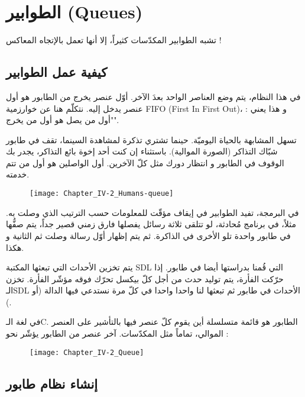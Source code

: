 \section{الطوابير (\textenglish{Queues})}

تشبه الطوابير المكدّسات كثيراً، إلا أنها تعمل بالإتجاه المعاكس !

\subsection{كيفية عمل الطوابير}

في هذا النظام، يتم وضع العناصر الواحد بعدَ الآخر. أوّل عنصر يخرج من الطابور هو أول عنصر يدخل إليه. نتكلّم هنا عن خوارزمية 
\textenglish{FIFO} (\textenglish{First In First Out})،
و هذا يعني : "أول من يصل هو أول من يخرج".

تسهل المشابهة بالحياة اليوميّة. حينما تشتري تذكرة لمشاهدة السينما، تقف في طابور شبّاك التذاكر (الصورة الموالية). باستثناء إن كنت أحد إخوة بائع التذاكر، يجدر بك الوقوف في الطابور و انتظار دورك مثل كلّ الآخرين. أول الواصلين هو أول من تتم خدمته.

\begin{figure}[H]
	\centering
	\texttt{[image: Chapter\_IV-2\_Humans-queue]}
\end{figure}

 في البرمجة، تفيد الطوابير في إيقاف مؤقّت للمعلومات حسب الترتيب الذي وصلت به. مثلاً، في برنامج مُحادثة، لو تتلقى ثلاثة رسائل يفصلها فارق زمني قصير جداً، يتم صفُّها في طابور واحدة تلو الأخرى في الذاكرة. ثم يتم إظهار أوّل رسالة وصلت ثم الثانية و هكذا.
 
يتم تخزين الأحداث التي تبعثها المكتبة
\textenglish{SDL}
التي قُمنا بدراستها أيضا في طابور. إذا حرّكت الفأرة، يتم توليد حدث من أجل كلّ بيكسل تحرّك فوقه مؤشّر الفأرة. تخزن الـ\textenglish{SDL}
الأحداث في طابور ثم تبعثها لنا واحدا واحدا في كلّ مرة نستدعي فيها الدالة
(أو
).

في لغة الـ\textenglish{C}.
الطابور هو قائمة متسلسلة أين يقوم كلّ عنصر فيها بالتأشير على العنصر الموالي، تماماً مثل المكدّسات. آخر عنصر من الطابور يؤشّر نحو
 :

\begin{figure}[H]
	\centering
	\texttt{[image: Chapter\_IV-2\_Queue]}
\end{figure}

\subsection{إنشاء نظام طابور}


